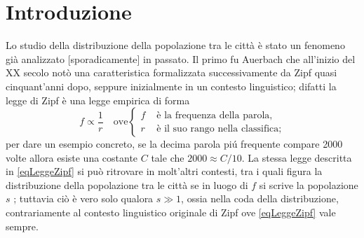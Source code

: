 

\chapter{Introduzione}\label{secIntroduzione}

  Lo studio della distribuzione della popolazione tra le città è stato un fenomeno già analizzato [sporadicamente] in passato. Il primo fu Auerbach \cite{Auerbach1913} che all'inizio del XX secolo notò una caratteristica formalizzata successivamente da Zipf\footnotemark{} \cite{Zipf2016} quasi cinquant'anni dopo, seppure inizialmente in un contesto linguistico; difatti la legge di Zipf è una legge empirica di forma
  \begin{equation}
    \label{eqLeggeZipf}
    f\propto\frac1 r\quad\text{ove}
    \left\{\begin{aligned}
      f&\text{ è la frequenza della parola,}\\
      r&\text{ è il suo rango nella classifica;}
    \end{aligned}\right.
  \end{equation}
  per dare un esempio concreto, se la decima parola piú frequente compare 2000 volte allora esiste una costante \(C\) tale che \(2000\approx C/10\). La stessa legge descritta in \eqref{eqLeggeZipf} si può ritrovare in molt'altri contesti, tra i quali figura la distribuzione della popolazione tra le città se in luogo di \(f\) si scrive la popolazione \(s\) \cite[Fig. 9-2 p. 375]{Zipf2016}; tuttavia ciò è vero solo qualora \(s\gg1\), ossia nella coda della distribuzione, contrariamente al contesto linguistico originale di Zipf ove \eqref{eqLeggeZipf} vale sempre.
 
